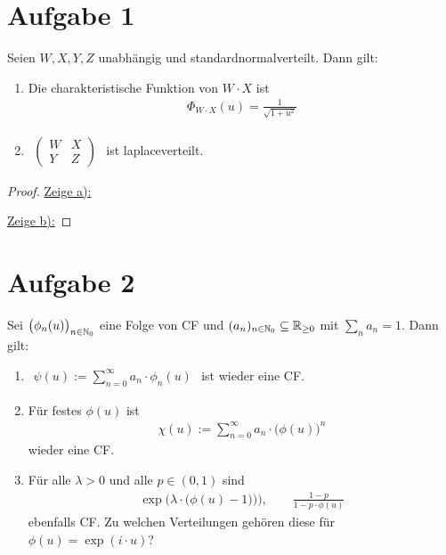 \documentclass[12pt,a4paper]{article}
\author{Willi Sontopski}
\begin{document}
\section*{Aufgabe 1}
Seien $W,X,Y,Z$ unabhängig und standardnormalverteilt. Dann gilt:
\begin{enumerate}[label=\alph*)]
	\item Die charakteristische Funktion von $W\cdot X$ ist 
	\begin{align*}
		\Phi_{W\cdot X}(u)=\frac{1}{\sqrt{1+u^2}}
	\end{align*}
	\item $\begin{aligned}
		\begin{pmatrix}
			W & X\\
			Y & Z
		\end{pmatrix}
	\end{aligned}$ ist laplaceverteilt.
\end{enumerate}

\begin{proof}
	\underline{Zeige a):}
	
	\underline{Zeige b):}
	
\end{proof}

\section*{Aufgabe 2}
Sei $\big(\phi_n(u)\big)_{n\in\mathbb{N}_0}$ eine Folge von CF und $(a_n)_{n\in\mathbb{N}_0}\subseteq\mathbb{R}_{\geq0}$ mit $\sum\limits_n a_n=1$.
Dann gilt:
\begin{enumerate}[label=\alph*)]
	\item $\begin{aligned}
		\psi(u):=\sum\limits_{n=0}^\infty a_n\cdot\phi_n(u)
	\end{aligned}$ ist wieder eine CF.
	\item Für festes $\phi(u)$ ist 
	\begin{align*}
		\chi(u):=\sum\limits_{n=0}^\infty a_n\cdot\big(\phi(u)\big)^n
	\end{align*}
	wieder eine CF.
	\item Für alle $\lambda>0$ und alle $p\in(0,1)$ sind
	\begin{align*}
		\exp\Big(\lambda\cdot\big(\phi(u)-1)\big)\Big),\qquad
		\frac{1-p}{1-p\cdot\phi(u)}
	\end{align*}
	ebenfalls CF. Zu welchen Verteilungen gehören diese für $\phi(u)=\exp(i\cdot u)$?
\end{enumerate} 
\end{document}
